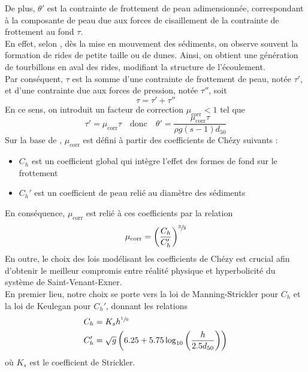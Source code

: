 \documentclass[11pt, a4paper, oneside]{report}
\begin{document}
De plus, $\theta'$ est la contrainte de frottement de peau adimensionnée, correspondant à la composante de peau due aux forces de cisaillement de la contrainte de frottement au fond $\tau$. \\
En effet, selon \cite{villaret2003modelisation}, dès la mise en mouvement des sédiments, on observe souvent la formation de rides de petite taille ou de dunes. Ainsi, on obtient une génération de tourbillons en aval des rides, modifiant la structure de l'écoulement. \\
Par conséquent, $\tau$ est la somme d'une contrainte de frottement de peau, notée $\tau'$, et d'une contrainte due aux forces de pression, notée $\tau''$, soit
\begin{equation}
    \tau = \tau' + \tau''
\end{equation}
En ce sens, on introduit un facteur de correction $\mu_\text{corr} < 1$ tel que
\begin{equation}
    \tau' = \mu_\text{corr} \tau \quad \text{donc} \quad \theta' = \frac{\mu_\text{corr} \tau}{\rho g (s-1) d_{50}}
\end{equation}
Sur la base de \cite{villaret2003modelisation}, $\mu_\text{corr}$ est défini à partir des coefficients de Chézy suivants :
\begin{itemize}
    \item $C_h$ est un coefficient global qui intègre l'effet des formes de fond sur le frottement
    \item $C_h'$ est un coefficient de peau relié au diamètre des sédiments
\end{itemize}
En conséquence, $\mu_\text{corr}$ est relié à ces coefficients par la relation
\begin{equation}
    \mu_\text{corr} = \left( \frac{C_h}{C_h'} \right)^{\sfrac{3}{2}}
\end{equation}
En outre, le choix des lois modélisant les coefficients de Chézy est crucial afin d'obtenir le meilleur compromis entre réalité physique et hyperbolicité du système de Saint-Venant-Exner. \\
En premier lieu, notre choix se porte vers la loi de Manning-Strickler pour $C_h$ et la loi de Keulegan \cite{keulegan1938laws} pour $C_h'$, donnant les relations
\begin{equation} \label{eq:Lois_Chezy}
    \begin{aligned}
        C_h & = K_s h^{\sfrac{1}{6}} \\
        C_h' & = \sqrt{g} \left( 6.25 + 5.75 \log_{10} \left( \frac{h}{2.5 d_{50}} \right) \right)
    \end{aligned}
\end{equation}
où $K_s$ est le coefficient de Strickler.
\end{document}
